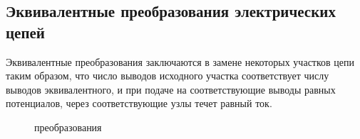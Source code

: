 \subsection{Эквивалентные преобразования электрических цепей}

Эквивалентные преобразования заключаются в замене некоторых участков цепи таким образом, что число выводов исходного участка соответствует числу выводов эквивалентного, и при подаче на соответствующие выводы равных потенциалов, через соответствующие узлы течет равный ток.

\begin{center}
	\begin{figure}[h!]
		\caption{преобразования}	
	\end{figure}
\end{center}	

\pagebreak